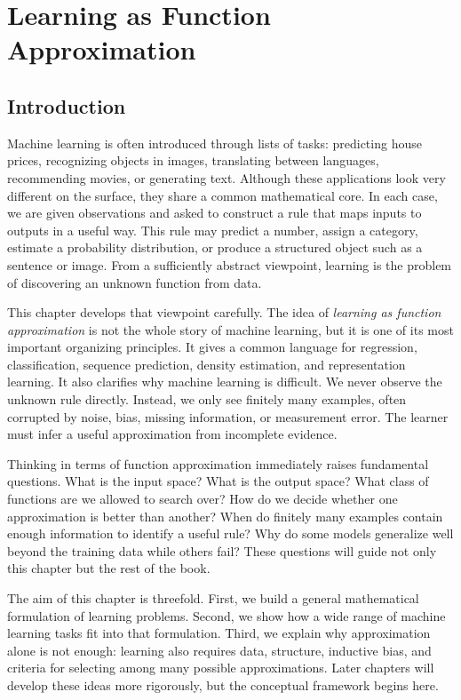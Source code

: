 \chapter{Learning as Function Approximation}

\section{Introduction}

Machine learning is often introduced through lists of tasks: predicting house prices, recognizing objects in images, translating between languages, recommending movies, or generating text. Although these applications look very different on the surface, they share a common mathematical core. In each case, we are given observations and asked to construct a rule that maps inputs to outputs in a useful way. This rule may predict a number, assign a category, estimate a probability distribution, or produce a structured object such as a sentence or image. From a sufficiently abstract viewpoint, learning is the problem of discovering an unknown function from data.

This chapter develops that viewpoint carefully. The idea of \emph{learning as function approximation} is not the whole story of machine learning, but it is one of its most important organizing principles. It gives a common language for regression, classification, sequence prediction, density estimation, and representation learning. It also clarifies why machine learning is difficult. We never observe the unknown rule directly. Instead, we only see finitely many examples, often corrupted by noise, bias, missing information, or measurement error. The learner must infer a useful approximation from incomplete evidence.

Thinking in terms of function approximation immediately raises fundamental questions. What is the input space? What is the output space? What class of functions are we allowed to search over? How do we decide whether one approximation is better than another? When do finitely many examples contain enough information to identify a useful rule? Why do some models generalize well beyond the training data while others fail? These questions will guide not only this chapter but the rest of the book.

The aim of this chapter is threefold. First, we build a general mathematical formulation of learning problems. Second, we show how a wide range of machine learning tasks fit into that formulation. Third, we explain why approximation alone is not enough: learning also requires data, structure, inductive bias, and criteria for selecting among many possible approximations. Later chapters will develop these ideas more rigorously, but the conceptual framework begins here.

